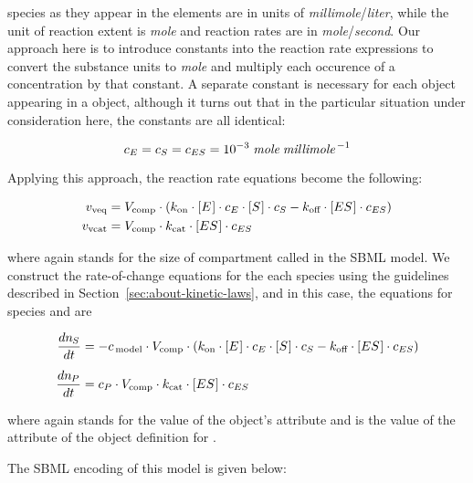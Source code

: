 species as they appear in the \KineticLaw elements are in units of
\emph{millimole}/\emph{liter}, while the unit of reaction extent
is \emph{mole} and reaction rates are in
\emph{mole}/\emph{second}.  Our approach here is to introduce
constants into the reaction rate expressions to convert the
substance units to \emph{mole} and multiply each occurence of a
concentration by that constant.  A separate constant is necessary
for each \Species object appearing in a \KineticLaw object,
although it turns out that in the particular situation under
consideration here, the constants are all identical:
\begin{linenomath}
  \begin{equation*}
      c_E = c_S = c_{ES} = 10^{-3}\;\emph{mole} \;\emph{millimole}^{\,-1}
  \end{equation*}
\end{linenomath}
Applying this approach, the reaction rate equations become the
following:
\begin{linenomath}
  \begin{align*}
    v_\text{veq}  & = V_\text{comp} \cdot (k_\text{on} \cdot [E\mkern1mu] \cdot c_E \cdot [S\mkern1mu] \cdot c_S
   - k_\text{off} \cdot [ES\mkern1mu] \cdot c_{ES})\\
    v_\text{vcat} & = V_\text{comp} \cdot k_\text{cat} \cdot [ES\mkern1mu] \cdot c_{ES}
  \end{align*}
\end{linenomath}
where again \Vcomp stands for the size of compartment called
 in the SBML model.  We construct the rate-of-change
equations for the each species using the guidelines described in
Section~\ref{sec:about-kinetic-laws}, and in this case, the
equations for species  and  are
\begin{linenomath}
  \begin{align*}
    \dfrac{d n_{\mkern-1muS}}{d t} & = - c_{\,\textrm{model}} \cdot V_\text{comp} \cdot
    (k_\text{on} \cdot [E\mkern1mu] \cdot c_E \cdot [S\mkern1mu] \cdot c_S
    - k_\text{off} \cdot [ES\mkern1mu] \cdot c_{ES}) \\[5pt]
    \dfrac{d n_{\mkern-1muP}}{d t} & = c_P \cdot V_\text{comp} \cdot k_\text{cat} \cdot [ES\mkern1mu] \cdot c_{ES}
  \end{align*}
\end{linenomath}
where again \csg stands for the value of the \Model object's
 attribute and \convP is the value of the
 attribute of the \Species object
definition for .

The SBML encoding of this model is given below:

